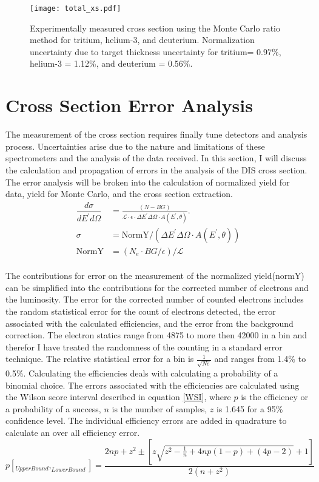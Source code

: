 \begin{figure}
	\hspace{-80pt}
	\texttt{[image: total\_xs.pdf]}
	\caption{Experimentally measured cross section using the Monte Carlo ratio method for tritium, helium-3, and deuterium. Normalization uncertainty due to target thickness uncertainty for tritium= 0.97\%, helium-3 = 1.12\%, and deuterium = 0.56\%. \label{CCplot}}
\end{figure}

\section{Cross Section Error Analysis}
The measurement of the cross section requires finally tune detectors and analysis process. Uncertainties arise due to the nature and limitations of these spectrometers and the analysis of the data received. In this section, I will discuss the calculation and propagation of errors in the analysis of the DIS cross section. The error analysis will be broken into the calculation of normalized yield for data, yield for Monte Carlo, and the cross section extraction. 
\begin{align}
\dfrac{d\sigma}{dE^{\prime}d\Omega} &= \frac{(N - BG)}{\mathscr{L} \cdot \epsilon \cdot \Delta E^{\prime} \Delta \Omega \cdot A(E^{\prime},\theta)}. \nonumber\\
\sigma &= \text{NormY}/\left(\Delta E^{\prime} \Delta \Omega \cdot A(E^{\prime},\theta)\right)\nonumber\\
\text{NormY} &= \left(N_e \cdot BG/\epsilon \right) / \mathscr{L}
\end{align}
\paragraph{}
The contributions for error on the measurement of the normalized yield(normY) can be simplified into the contributions for the corrected number of electrons and the luminosity. The error for the corrected number of counted electrons includes the random statistical error for the count of electrons detected, the error associated with the calculated efficiencies, and the error from the background correction. The electron statics range from 4875 to more then 42000 in a bin and therefor I have treated the randomness of the counting in a standard error technique. The relative statistical error for a bin is $\frac{1}{\sqrt{Ne}}$ and ranges from 1.4\% to 0.5\%. Calculating the efficiencies deals with calculating a probability of a binomial choice. The errors associated with the efficiencies are calculated using the Wilson score interval described in equation \ref{WSI}, where $p$ is the efficiency or a probability of a success, $n$ is the number of samples, $z$ is 1.645 for a 95\% confidence level. The individual efficiency errors are added in quadrature to calculate an over all efficiency error.
\begin{equation}
p[_{UpperBound},_{LowerBound}] = \frac{ 2np +z^2 \pm \left[z\sqrt{z^2 - \frac{1}{n} + 4np(1-p) +(4p-2)} + 1 \right]}{2(n+z^2)} \label{WSI}
\end{equation}


